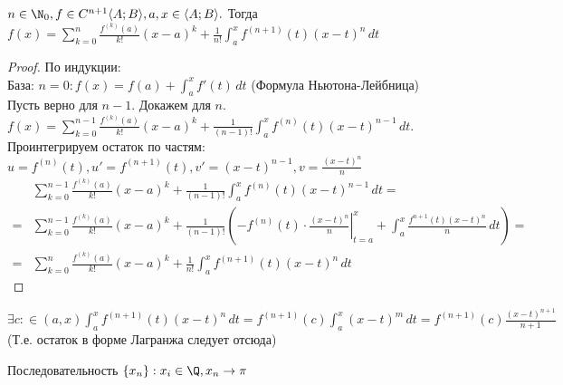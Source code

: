 \begin{Thm} 
	$n \in \N_0,\\ f \in C^{n+1} \langle A; B \rangle, a, x \in \langle A; B \rangle .$ Тогда $\displaystyle f(x) = \sum_{k=0}^{n} \frac{f^{(k)}(a)}{k!}
	(x-a)^k + \frac{1}{n!} \int_{a}^{x} f^{(n+1)}(t)(x-t)^n \,dt$
\end{Thm} 

\begin{proof}
	По индукции:\\
	База: $\displaystyle n=0: f(x) = f(a) + \int_{a}^{x} f'(t) \,dt$ (Формула Ньютона-Лейбница)\\
	Пусть верно для $n-1$. Докажем для $n$.\\
	$\displaystyle f(x) = \sum_{k=0}^{n-1} \frac{f^{(k)}(a)}{k!} (x-a)^k + \frac{1}{(n-1)!} \int_{a}^{x} 
	f^{(n)}(t) (x-t)^{n-1}\,dt$. Проинтегрируем остаток по частям: $\displaystyle u = f^{(n)}(t), u' = f^{(n+1)}(t), 
	v' = (x-t)^{n-1}, v = \frac{(x-t)^n}{n}$\\

	\begin{align*}
		&\displaystyle \sum_{k=0}^{n-1} \frac{f^{(k)}(a)}{k!} (x-a)^k + \frac{1}{(n-1)!} \int_{a}^{x} f^{(n)}(t) (x-t)^{n-1}\,dt = \\
		= &\sum_{k=0}^{n-1} \frac{f^{(k)}(a)}{k!}(x-a)^k 
		+ \frac{1}{(n-1)!} \left(-f^{(n)}(t) \cdot \left. \frac{(x-t)^n}{n} \right|^x_{t=a} + 
		\int_{a}^{x} \frac{f^{n+1}(t)(x-t)^n}{n}\,dt\right) = \\
		= &\sum_{k=0}^{n} \frac{f^{(k)}(a)}{k!} (x-a)^k + \frac{1}{n!} \int_{a}^{x} f^{(n+1)}(t) (x-t)^n \,dt
	\end{align*}
\end{proof}

\begin{Rem}
	$\displaystyle \exists c: \in (a,x) \int_{a}^{x} f^{(n+1)} (t) (x-t)^n \,dt = f^{(n+1)}(c) \int_{a}^{x} (x-t)^m \,dt = 
	f^{(n+1)}(c) \frac{(x-t)^{n+1}}{n+1}$ (Т.е. остаток в форме Лагранжа 
	следует отсюда)
\end{Rem}

Последовательность $\{x_n\}: x_i \in \Q, x_n \to \pi$

